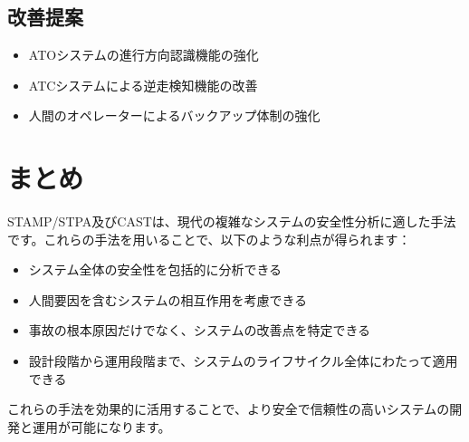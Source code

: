 \subsection{改善提案}

\begin{itemize}
    \item ATOシステムの進行方向認識機能の強化
    \item ATCシステムによる逆走検知機能の改善
    \item 人間のオペレーターによるバックアップ体制の強化
\end{itemize}

\section{まとめ}

STAMP/STPA及びCASTは、現代の複雑なシステムの安全性分析に適した手法です。これらの手法を用いることで、以下のような利点が得られます：

\begin{itemize}
    \item システム全体の安全性を包括的に分析できる
    \item 人間要因を含むシステムの相互作用を考慮できる
    \item 事故の根本原因だけでなく、システムの改善点を特定できる
    \item 設計段階から運用段階まで、システムのライフサイクル全体にわたって適用できる
\end{itemize}

これらの手法を効果的に活用することで、より安全で信頼性の高いシステムの開発と運用が可能になります。

